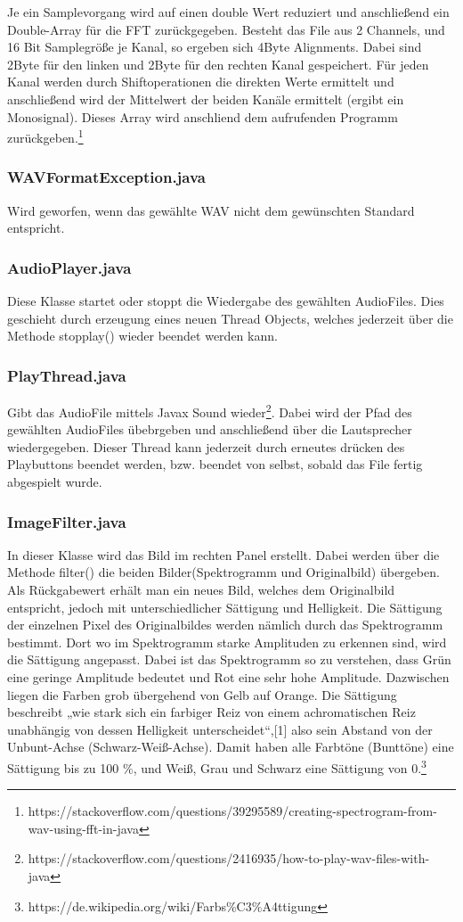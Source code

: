 \documentclass[12pt,a4paper]{article}
\begin{document}
Je ein Samplevorgang wird auf einen double Wert reduziert und anschließend ein Double-Array für die FFT zurückgegeben.
Besteht das File aus 2 Channels, und 16 Bit Samplegröße je Kanal, so ergeben sich 4Byte Alignments. Dabei sind 2Byte für den linken und 2Byte für den rechten Kanal gespeichert. Für jeden Kanal werden durch Shiftoperationen die direkten Werte ermittelt und anschließend wird der Mittelwert der beiden Kanäle ermittelt (ergibt ein Monosignal). Dieses Array wird anschliend dem aufrufenden Programm zurückgeben.\footnote{https://stackoverflow.com/questions/39295589/creating-spectrogram-from-wav-using-fft-in-java}

\subsubsection{WAVFormatException.java}
Wird geworfen, wenn das gewählte WAV nicht dem gewünschten Standard entspricht.

\subsubsection{AudioPlayer.java}
Diese Klasse startet oder stoppt die Wiedergabe des gewählten AudioFiles. Dies geschieht durch erzeugung eines neuen Thread Objects, welches jederzeit über die Methode stopplay() wieder beendet werden kann. 
\subsubsection{PlayThread.java}
Gibt das AudioFile mittels Javax Sound wieder\footnote{https://stackoverflow.com/questions/2416935/how-to-play-wav-files-with-java}. Dabei wird der Pfad des gewählten AudioFiles übebrgeben und anschließend über die Lautsprecher wiedergegeben. Dieser Thread kann jederzeit durch erneutes drücken des Playbuttons beendet werden, bzw. beendet von selbst, sobald das File fertig abgespielt wurde.
\subsubsection{ImageFilter.java}
In dieser Klasse wird das Bild im rechten Panel erstellt. Dabei werden über die Methode filter() die beiden Bilder(Spektrogramm und Originalbild) übergeben. Als Rückgabewert erhält man ein neues Bild, welches dem Originalbild entspricht, jedoch mit unterschiedlicher Sättigung und Helligkeit. Die Sättigung der einzelnen Pixel des Originalbildes werden nämlich durch das Spektrogramm bestimmt. Dort wo im Spektrogramm starke Amplituden zu erkennen sind, wird die Sättigung angepasst.
Dabei ist das Spektrogramm so zu verstehen, dass Grün eine geringe Amplitude bedeutet und Rot eine sehr hohe Amplitude.
Dazwischen liegen die Farben grob übergehend von Gelb auf Orange.
Die Sättigung beschreibt „wie stark sich ein farbiger Reiz von einem achromatischen Reiz unabhängig von dessen Helligkeit unterscheidet“,[1] also sein Abstand von der Unbunt-Achse (Schwarz-Weiß-Achse). Damit haben alle Farbtöne (Bunttöne) eine Sättigung bis zu 100 \%, und Weiß, Grau und Schwarz eine Sättigung von 0.\footnote{https://de.wikipedia.org/wiki/Farbs\%C3\%A4ttigung}
\end{document}
